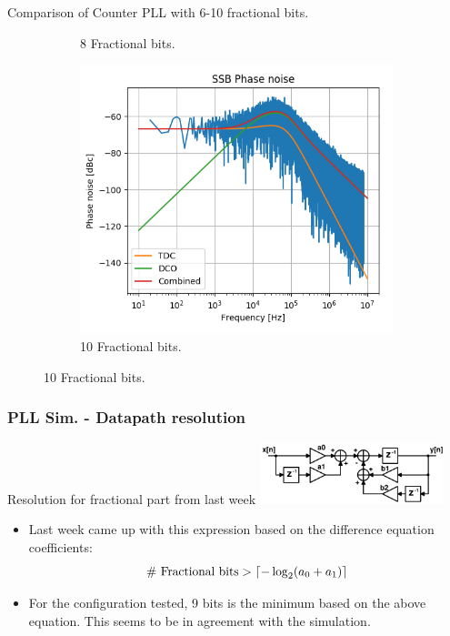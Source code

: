 \documentclass[t, screen, aspectratio=43]{beamer}
\begin{document}
\begin{frame}
\begin{block}{Comparison of Counter PLL with 6-10 fractional bits.}
\begin{figure}[htb!]
\begin{subfigure}{.33\textwidth}
	            \caption{\scriptsize 8 Fractional bits.}
	            \label{fig:rosc_3stg_wave}
	        \end{subfigure}
	       	\begin{subfigure}{.33\textwidth}
	            \centering
	            \includegraphics[width=1\linewidth]{10bit_frac_pn.png}
	            \caption{\scriptsize 10 Fractional bits.}
	            \label{fig:rosc_3stg_wave}
	        \end{subfigure}
	        \label{fig:rosc_3stg}
	    \end{figure}
	\end{block}
\end{frame}


\begin{frame}
	\frametitle{PLL Sim. - Datapath resolution}
	\begin{block}{Resolution for fractional part from last week}
		\center\includegraphics[width=0.4\textwidth, angle=0]{discrete_filter2.pdf}
		\begin{itemize}
			\scriptsize
			\item Last week came up with this expression based on the difference equation coefficients:
	    \begin{equation}
			\textnormal{\# Fractional bits} > \lceil -\log_2(a_0+a_1) \rceil
		\end{equation}
			\scriptsize
			\item For the configuration tested, 9 bits is the minimum based on the above equation. This seems to be in agreement with the simulation.
		\end{itemize} 	
	\end{block}
\end{frame}
\end{document}
